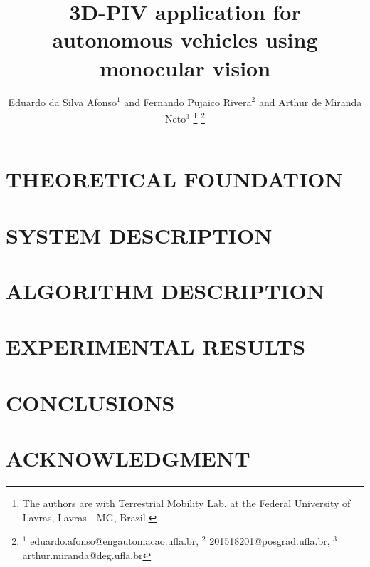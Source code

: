 \documentclass[letterpaper, 10 pt,conference]{ieeeconf}  %
\title{\LARGE \bf
3D-PIV application for autonomous vehicles using monocular vision
}
\author{Eduardo da Silva Afonso$^{1}$ and Fernando Pujaico Rivera$^{2}$ and Arthur de Miranda Neto$^{3}$%
\thanks{The authors are with Terrestrial Mobility Lab. at the Federal University of Lavras, Lavras - MG, Brazil.}%
\thanks{$^{1}$  eduardo.afonso@engautomacao.ufla.br, $^{2}$  201518201@posgrad.ufla.br, $^{3}$  arthur.miranda@deg.ufla.br}%
}
\begin{document}
\maketitle
\thispagestyle{empty}
\pagestyle{empty}

\begin{abstract}



\end{abstract}



\section{THEORETICAL FOUNDATION}




\section{SYSTEM DESCRIPTION}


\section{ALGORITHM DESCRIPTION}
 





\section{EXPERIMENTAL RESULTS}



\section{CONCLUSIONS}

\addtolength{\textheight}{-12cm}

\section*{ACKNOWLEDGMENT}



\end{document}
